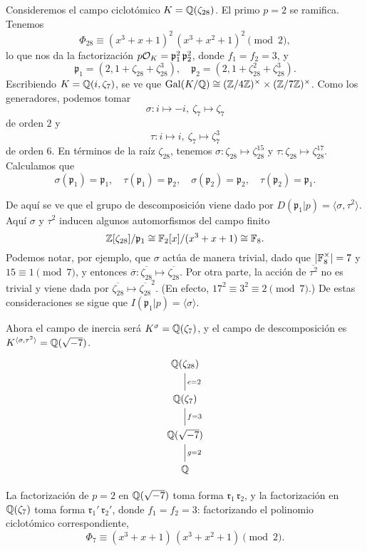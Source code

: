 \begin{ejemplo}
  Consideremos el campo ciclotómico $K = \mathbb{Q} (\zeta_{28})$.
  El primo $p = 2$
  se ramifica. Tenemos
  $$\Phi_{28} \equiv (x^3 + x + 1)^2\,(x^3 + x^2 + 1)^2 \pmod{2},$$
  lo que nos da la factorización
  $p\mathcal{O}_K = \mathfrak{p}_1^2 \, \mathfrak{p}_2^2$,
  donde $f_1 = f_2 = 3$, y
  \[ \mathfrak{p}_1 = (2, 1 + \zeta_{28} + \zeta_{28}^3),
  \quad
  \mathfrak{p}_2 = (2, 1 + \zeta_{28}^2 + \zeta_{28}^3). \]
  Escribiendo $K = \mathbb{Q} (i, \zeta_7)$, se ve que
  $\operatorname{Gal} (K/\mathbb{Q}) \cong (\mathbb{Z}/4\mathbb{Z})^\times \times (\mathbb{Z}/7\mathbb{Z})^\times$.
  Como los generadores, podemos tomar
  $$\sigma\colon i \mapsto -i, ~ \zeta_7 \mapsto \zeta_7$$
  de orden $2$ y
  $$\tau\colon i \mapsto i, ~ \zeta_7 \mapsto \zeta_7^3$$
  de orden $6$. En términos de la raíz $\zeta_{28}$, tenemos
  $\sigma\colon \zeta_{28} \mapsto \zeta_{28}^{15}$ y
  $\tau\colon \zeta_{28} \mapsto \zeta_{28}^{17}$.
  Calculamos que
  \[ \sigma (\mathfrak{p}_1) = \mathfrak{p}_1, \quad
  \tau (\mathfrak{p}_1) = \mathfrak{p}_2, \quad
  \sigma (\mathfrak{p}_2) = \mathfrak{p}_2, \quad
  \tau (\mathfrak{p}_2) = \mathfrak{p}_1. \]

  De aquí se ve que el grupo de descomposición viene dado por
  $D (\mathfrak{p}_1|p) = \langle\sigma,\tau^2\rangle$.
  Aquí $\sigma$ y $\tau^2$ inducen algunos automorfismos del campo finito
  $$\mathbb{Z} [\zeta_{28}]/\mathfrak{p}_1 \cong \mathbb{F}_2 [x]/(x^3 + x + 1) \cong \mathbb{F}_8.$$
  Podemos notar, por ejemplo, que $\sigma$ actúa de manera trivial, dado que
  $|\mathbb{F}_8^\times| = 7$ y $15 \equiv 1 \pmod{7}$, y entonces
  $\overline{\sigma}\colon \overline{\zeta_{28}} \mapsto \overline{\zeta_{28}}$.
  Por otra parte, la acción de $\overline{\tau^2}$ no es trivial y viene dada
  por $\overline{\zeta_{28}} \mapsto \overline{\zeta_{28}}^2$. (En efecto,
  $17^2 \equiv 3^2 \equiv 2 \pmod{7}$.)  De estas consideraciones se sigue que
  $I (\mathfrak{p}_1|p) = \langle\sigma\rangle$.

  Ahora el campo de inercia será $K^\sigma = \mathbb{Q} (\zeta_7)$, y el campo de
  descomposición es $K^{\langle\sigma,\tau^2\rangle} = \mathbb{Q} (\sqrt{-7})$.
  \[ \begin{tikzcd}
    \QQ (\zeta_{28}) \ar[-]{d}{e = 2} \\
    \QQ (\zeta_7) \ar[-]{d}{f = 3} \\
    \QQ (\sqrt{-7}) \ar[-]{d}{g = 2} \\
    \QQ
  \end{tikzcd} \]

  La factorización de $p = 2$ en $\mathbb{Q} (\sqrt{-7})$ toma forma
  $\mathfrak{r}_1\,\mathfrak{r}_2$, y la factorización en $\mathbb{Q} (\zeta_7)$
  toma forma $\mathfrak{r}_1'\,\mathfrak{r}_2'$, donde $f_1 = f_2 = 3$:
  factorizando el polinomio ciclotómico correspondiente,
  $$\Phi_7 \equiv (x^3 + x + 1)\,(x^3 + x^2 + 1) \pmod{2}.$$


\end{ejemplo}
